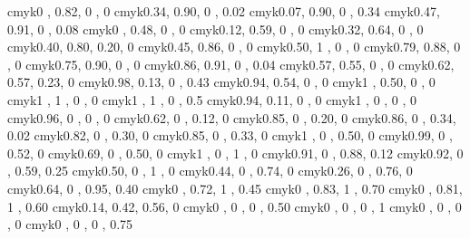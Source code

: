 \definecolor{rhodamine}     {cmyk}{0   , 0.82, 0   , 0   }
\definecolor{mulberry}      {cmyk}{0.34, 0.90, 0   , 0.02}
\definecolor{redviolet}     {cmyk}{0.07, 0.90, 0   , 0.34}
\definecolor{fuchsia}       {cmyk}{0.47, 0.91, 0   , 0.08}
\definecolor{lavender}      {cmyk}{0   , 0.48, 0   , 0   }
\definecolor{thistle}       {cmyk}{0.12, 0.59, 0   , 0   }
\definecolor{orchid}        {cmyk}{0.32, 0.64, 0   , 0   }
\definecolor{darkorchid}    {cmyk}{0.40, 0.80, 0.20, 0   }
\definecolor{purple}        {cmyk}{0.45, 0.86, 0   , 0   }
\definecolor{plum}          {cmyk}{0.50, 1   , 0   , 0   }
\definecolor{violet}        {cmyk}{0.79, 0.88, 0   , 0   }
\definecolor{royalpurple}   {cmyk}{0.75, 0.90, 0   , 0   }
\definecolor{blueviolet}    {cmyk}{0.86, 0.91, 0   , 0.04}
\definecolor{periwinkle}    {cmyk}{0.57, 0.55, 0   , 0   }
     {cmyk}{0.62, 0.57, 0.23, 0   }
  {cmyk}{0.98, 0.13, 0   , 0.43}
      {cmyk}{0.94, 0.54, 0   , 0   }
     {cmyk}{1   , 0.50, 0   , 0   }
\definecolor{blue}          {cmyk}{1   , 1   , 0   , 0   }
     {cmyk}{1   , 1   , 0   , 0.5 }
\definecolor{cerulean}      {cmyk}{0.94, 0.11, 0   , 0   }
\definecolor{cyan}          {cmyk}{1   , 0   , 0   , 0   }
\definecolor{processblue}   {cmyk}{0.96, 0   , 0   , 0   }
\definecolor{skyblue}       {cmyk}{0.62, 0   , 0.12, 0   }
\definecolor{turquoise}     {cmyk}{0.85, 0   , 0.20, 0   }
\definecolor{tealblue}      {cmyk}{0.86, 0   , 0.34, 0.02}
\definecolor{aquamarine}    {cmyk}{0.82, 0   , 0.30, 0   }
\definecolor{bluegreen}     {cmyk}{0.85, 0   , 0.33, 0   }
\definecolor{emerald}       {cmyk}{1   , 0   , 0.50, 0   }
\definecolor{junglegreen}   {cmyk}{0.99, 0   , 0.52, 0   }
\definecolor{seagreen}      {cmyk}{0.69, 0   , 0.50, 0   }
\definecolor{green}         {cmyk}{1   , 0   , 1   , 0   }
\definecolor{forestgreen}   {cmyk}{0.91, 0   , 0.88, 0.12}
\definecolor{pinegreen}     {cmyk}{0.92, 0   , 0.59, 0.25}
\definecolor{limegreen}     {cmyk}{0.50, 0   , 1   , 0   }
\definecolor{yellowgreen}   {cmyk}{0.44, 0   , 0.74, 0   }
\definecolor{springgreen}   {cmyk}{0.26, 0   , 0.76, 0   }
\definecolor{olivegreen}    {cmyk}{0.64, 0   , 0.95, 0.40}
\definecolor{rawsienna}     {cmyk}{0   , 0.72, 1   , 0.45}
\definecolor{sepia}         {cmyk}{0   , 0.83, 1   , 0.70}
\definecolor{brown}         {cmyk}{0   , 0.81, 1   , 0.60}
\definecolor{tan}           {cmyk}{0.14, 0.42, 0.56, 0   }
\definecolor{gray}          {cmyk}{0   , 0   , 0   , 0.50}
\definecolor{black}         {cmyk}{0   , 0   , 0   , 1   }
\definecolor{white}         {cmyk}{0   , 0   , 0   , 0   } 
\definecolor{darkgray}      {cmyk}{0   , 0   , 0   , 0.75}

